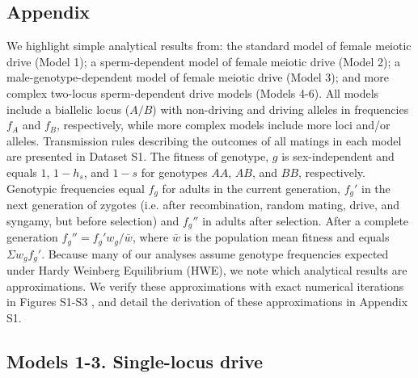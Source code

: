 \documentclass{pnastwo}
\begin{document}
\begin{article}
\section{Appendix}
We highlight simple analytical results from: 
	the standard model of female meiotic drive (Model 1); a sperm-dependent 
	model of female meiotic drive (Model 2); a male-genotype-dependent model of
	female meiotic drive (Model 3); and more complex two-locus sperm-dependent drive models (Models 4-6). 
All models include a biallelic locus ($A/B$) with non-driving and driving alleles in frequencies $f_A$ and $f_B$, 
	respectively, while more complex models include more loci and/or alleles.  
Transmission rules describing the outcomes of all matings in each
	model are presented in Dataset S1. 
The fitness of genotype, $g$ is sex-independent and equals $1$, $1-h_s$, and $1-s$ for genotypes $AA$, $AB$, and $BB$, respectively. 
Genotypic frequencies  equal  $f_g$ for adults in the current generation, 
	$f_g'$ in the next generation of zygotes (i.e. after recombination, random mating, drive, and syngamy, but before selection)
	and $f_g''$ in adults after selection. 
After a complete generation $f_g'' = f_g' w_g/\bar{w}$, where $\bar{w}$ is the population mean fitness and equals $\Sigma w_g f_g'$. 
Because many of our analyses assume genotype frequencies expected under Hardy Weinberg Equilibrium (HWE), we note which analytical results are approximations. 
We verify these approximations with exact numerical iterations in Figures S1-S3 , and detail the derivation of these approximations in Appendix S1.  



\subsection{Models 1-3. Single-locus drive}

\end{article}
\end{document}
